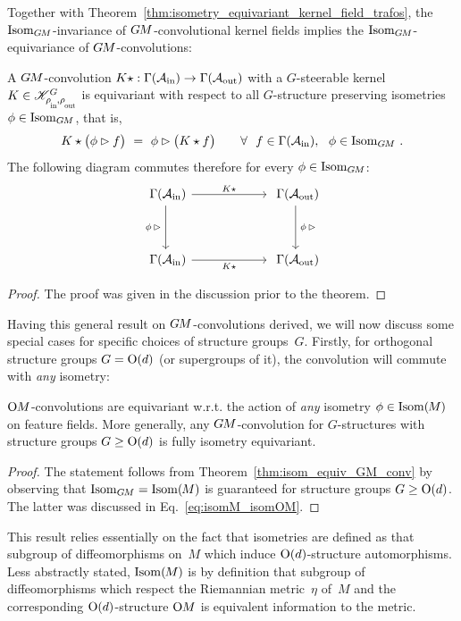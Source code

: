 Together with Theorem~\ref{thm:isometry_equivariant_kernel_field_trafos}, the $\operatorname{Isom}_{G\mkern-1.4muM}$-invariance of $G\mkern-1.4muM$-convolutional kernel fields implies the $\operatorname{Isom}_{G\mkern-1.4muM}$-equivariance of $G\mkern-1.4muM$-convolutions:
\begin{thm}
\label{thm:isom_equiv_GM_conv}
    A $G\mkern-1.4muM$-convolution $K\star: \Gamma(\mathcal{A}_\textup{in})\to \Gamma(\mathcal{A}_\textup{out})$ with a $G$-steerable kernel $K\in\KG$ is equivariant with respect to all $G$-structure preserving isometries $\phi \in \operatorname{Isom}_{G\mkern-1.4muM}$, that is,
    \begin{align}
        K \star \big( \phi \rhd f \big) \ =\ 
        \phi \rhd \big( K \star  f \big)
        \qquad \forall\ \ f\in\Gamma(\Ain), \ \ \phi\in \IsomGM \,.
    \end{align}
    The following diagram commutes therefore for every $\phi \in \operatorname{Isom}_{G\mkern-1.4muM}$:
    \begin{equation}
    \begin{tikzcd}[column sep=60pt, row sep=35, font=\normalsize]
        \Gamma(\Ain)
            \arrow[r, "K\star"]
            \arrow[d, "\phi\,\rhd\,"']
        &
        \Gamma(\Aout)
            \arrow[d, "\,\phi\,\rhd"]
        \\
        \Gamma(\Ain)
            \arrow[r, "K\star"']
        &
        \Gamma(\Aout)
    \end{tikzcd}
    \end{equation}
\end{thm}
\begin{proof}
    The proof was given in the discussion prior to the theorem.
\end{proof}



Having this general result on $G\mkern-1.4muM$-convolutions derived, we will now discuss some special cases for specific choices of structure groups~$G$.
Firstly, for orthogonal structure groups $G=\operatorname{O}(d)$ (or supergroups of it), the convolution will commute with \emph{any} isometry:
\begin{thm}
\label{thm:Od_equiv_OM_conv}
    $\operatorname{O}\mkern-3.6muM$-convolutions are equivariant w.r.t. the action of \emph{any} isometry $\phi \in \operatorname{Isom}(\mkern-1.5mu M \mkern-.5mu)$ on feature fields.
    More generally, any $G\mkern-1.4muM$-convolution for $G$-structures with structure groups $G\geq\operatorname{O}(d)$ is fully isometry equivariant.
\end{thm}
\begin{proof}
    The statement follows from Theorem~\eqref{thm:isom_equiv_GM_conv} by observing that $\operatorname{Isom}_{G\mkern-1.4muM} = \operatorname{Isom}(\mkern-1.5mu M \mkern-.5mu)$ is guaranteed for structure groups $G \geq \operatorname{O}(d)$.
    The latter was discussed in Eq.~\eqref{eq:isomM_isomOM}.
\end{proof}
This result relies essentially on the fact that isometries are defined as that subgroup of diffeomorphisms on~$M$ which induce $\operatorname{O}(d)$-structure automorphisms.
Less abstractly stated, $\operatorname{Isom}(\mkern-1.5mu M \mkern-.5mu)$ is by definition that subgroup of diffeomorphisms which respect the Riemannian metric~$\eta$ of~$M$ and the corresponding $\operatorname{O}(d)$-structure $\operatorname{O}\mkern-3.6muM$ is equivalent information to the metric.


